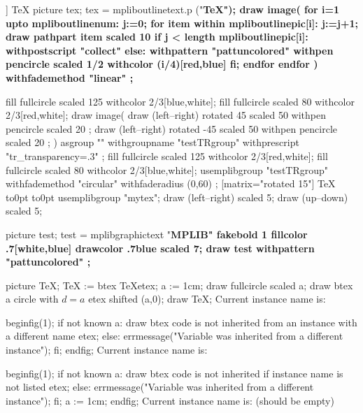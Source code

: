   ]
  \fiverm\TeX
\endmppattern
\mpfig
  picture tex;
  tex = mpliboutlinetext.p ("\bf \TeX");
  draw image(
  for i=1 upto mpliboutlinenum:
    j:=0;
    for item within mpliboutlinepic[i]:
      j:=j+1;
      draw pathpart item scaled 10
      if j < length mpliboutlinepic[i]:
          withpostscript "collect"
      else:
          withpattern "pattuncolored"
          withpen pencircle scaled 1/2
          withcolor (i/4)[red,blue]
      fi;
    endfor
  endfor
  )
  withfademethod "linear"
  ;
\endmpfig
\par\leavevmode
\mpfig
fill fullcircle scaled 125 withcolor 2/3[blue,white];
fill fullcircle scaled 80  withcolor 2/3[red,white];
draw image(
  draw (left--right) rotated 45 scaled 50
    withpen pencircle scaled 20
    ;
  draw (left--right) rotated -45 scaled 50
    withpen pencircle scaled 20
    ;
  )
  asgroup ""
  withgroupname "testTRgroup"
  withprescript "tr_transparency=.3"
  ;
\endmpfig
\mpfig
fill fullcircle scaled 125 withcolor 2/3[red,white];
fill fullcircle scaled 80  withcolor 2/3[blue,white];
usemplibgroup "testTRgroup"
  withfademethod "circular"
  withfaderadius (0,60)
  ;
\endmpfig
{}[matrix="rotated 15"] \TeX \endmplibgroup
\hbox to0pt{\hss\vrule width.5pt height5pt depth5pt\hss}%
\hbox to0pt{\hss\vrule width10pt height.25pt depth.25pt\hss}%
%
\mpfig usemplibgroup "mytex"; draw (left--right) scaled 5; draw (up--down) scaled 5; \endmpfig
\par
\mpfig
  picture test; test = mplibgraphictext "\bf MPLIB"
  fakebold 1 fillcolor .7[white,blue] drawcolor .7blue scaled 7;
  draw test withpattern "pattuncolored" ;
\endmpfig
{}

\baselineskip
{}

\mplibcode[instanceOne]
  picture TeX;
  TeX := btex \TeX etex;
a := 1cm;
draw fullcircle scaled a;
draw btex a circle with $d=a$ etex shifted (a,0);
draw TeX;
\endmplibcode
Current instance name is: \currentmpinstancename {}\baselineskip

\mplibcode[instanceTwo]
beginfig(1);
if not known a:
  draw btex code is not inherited from an instance with a different name etex;
else:
  errmessage("Variable was inherited from a different instance");
fi;
endfig;
\endmplibcode
Current instance name is: \currentmpinstancename {}\baselineskip

\mplibcode
beginfig(1);
if not known a:
  draw btex code is not inherited if instance name is not listed etex;
else:
  errmessage("Variable was inherited from a different instance");
fi;
a := 1cm;
endfig;
\endmplibcode
Current instance name is: \currentmpinstancename (should be empty) \baselineskip

